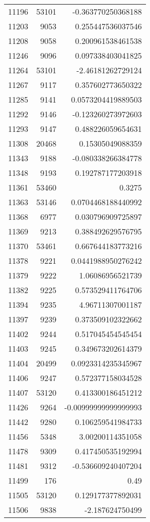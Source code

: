 \begin{tabular}{r | r | r}
11196 & 53101 & -0.363770250368188 \\
11203 & 9053 & 0.255447536037546 \\
11208 & 9058 & 0.200961538461538 \\
11246 & 9096 & 0.097338403041825 \\
11264 & 53101 & -2.46181262729124 \\
11267 & 9117 & 0.357602773650322 \\
11285 & 9141 & 0.0573204419889503 \\
11292 & 9146 & -0.123260273972603 \\
11293 & 9147 & 0.488226059654631 \\
11308 & 20468 & 0.15305049088359 \\
11343 & 9188 & -0.080338266384778 \\
11348 & 9193 & 0.192787177203918 \\
11361 & 53460 & 0.3275 \\
11363 & 53146 & 0.0704468188440992 \\
11368 & 6977 & 0.030796909725897 \\
11369 & 9213 & 0.388492629576795 \\
11370 & 53461 & 0.667644183773216 \\
11378 & 9221 & 0.0441988950276242 \\
11379 & 9222 & 1.06086956521739 \\
11382 & 9225 & 0.573529411764706 \\
11394 & 9235 & 4.96711307001187 \\
11397 & 9239 & 0.373509102322662 \\
11402 & 9244 & 0.517045454545454 \\
11403 & 9245 & 0.349673202614379 \\
11404 & 20499 & 0.0923314235345967 \\
11406 & 9247 & 0.572377158034528 \\
11407 & 53120 & 0.413300186451212 \\
11426 & 9264 & -0.00999999999999993 \\
11442 & 9280 & 0.106259541984733 \\
11456 & 5348 & 3.00200114351058 \\
11478 & 9309 & 0.417450535192994 \\
11481 & 9312 & -0.536609240407204 \\
11499 & 176 & 0.49 \\
11505 & 53120 & 0.129177377892031 \\
11506 & 9838 & -2.187624750499 \\

\end{tabular}
